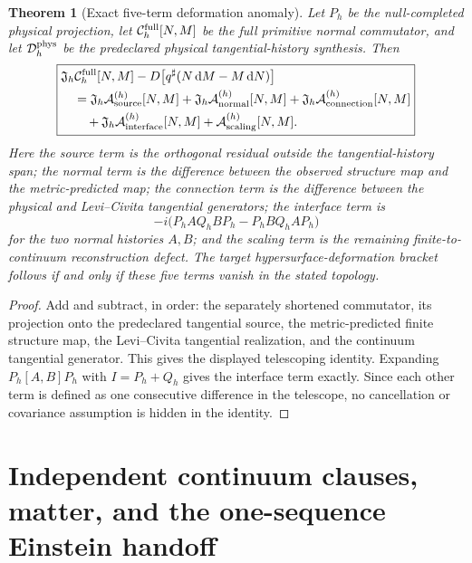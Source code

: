 \documentclass[11pt]{article}
\newtheorem{theorem}{Theorem}[section]
\theoremstyle{definition}
\theoremstyle{remark}
\newcommand{\dd}{\mathrm d}
\begin{document}
\begin{theorem}[Exact five-term deformation anomaly]
\label{thm:deformation-anomaly-master}
Let $P_h$ be the null-completed physical projection, let
$\mathcal C_h^{\rm full}[N,M]$ be the full primitive normal commutator, and let
$\mathcal D_h^{\rm phys}$ be the predeclared physical tangential-history
synthesis.  Then
\[
 \boxed{
 \begin{aligned}
 &\mathfrak J_h\mathcal C_h^{\rm full}[N,M]
 -D\!\left[q^\sharp(N\,\dd M-M\,\dd N)\right]\\
 &\quad=\mathfrak J_h\mathcal A_{\rm source}^{(h)}[N,M]
 +\mathfrak J_h\mathcal A_{\rm normal}^{(h)}[N,M]
 +\mathfrak J_h\mathcal A_{\rm connection}^{(h)}[N,M]\\
 &\qquad
 +\mathfrak J_h\mathcal A_{\rm interface}^{(h)}[N,M]
 +\mathcal A_{\rm scaling}^{(h)}[N,M].
 \end{aligned}}
\]
Here the source term is the orthogonal residual outside the tangential-history
span; the normal term is the difference between the observed structure map and
the metric-predicted map; the connection term is the difference between the
physical and Levi--Civita tangential generators; the interface term is
\[
 \boxed{-i\bigl(P_hAQ_hBP_h-P_hBQ_hAP_h\bigr)}
\]
for the two normal histories $A,B$; and the scaling term is the remaining
finite-to-continuum reconstruction defect.  The target hypersurface-deformation
bracket follows if and only if these five terms vanish in the stated topology.
\end{theorem}

\begin{proof}
Add and subtract, in order: the separately shortened commutator, its projection
onto the predeclared tangential source, the metric-predicted finite structure
map, the Levi--Civita tangential realization, and the continuum tangential
generator.  This gives the displayed telescoping identity.  Expanding
$P_h[A,B]P_h$ with $I=P_h+Q_h$ gives the interface term exactly.  Since each
other term is defined as one consecutive difference in the telescope, no
cancellation or covariance assumption is hidden in the identity.
\end{proof}

\section{Independent continuum clauses, matter, and the one-sequence Einstein handoff}
\end{document}
